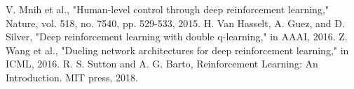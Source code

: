 \documentclass[conference]{IEEEtran}
\begin{document}
\begin{thebibliography}{00}
 V. Mnih et al., "Human-level control through deep reinforcement learning," Nature, vol. 518, no. 7540, pp. 529-533, 2015.
 H. Van Hasselt, A. Guez, and D. Silver, "Deep reinforcement learning with double q-learning," in AAAI, 2016.
 Z. Wang et al., "Dueling network architectures for deep reinforcement learning," in ICML, 2016.
 R. S. Sutton and A. G. Barto, Reinforcement Learning: An Introduction. MIT press, 2018.
\end{thebibliography}
\end{document}

